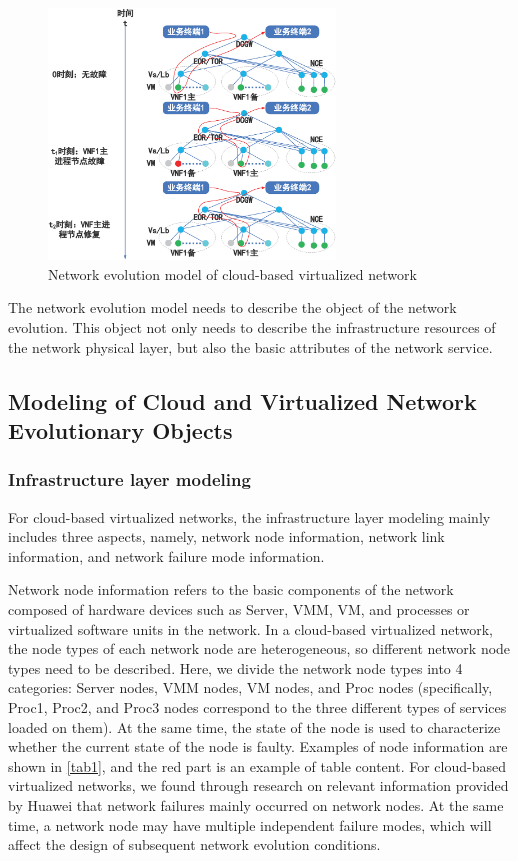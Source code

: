 \documentclass[journal]{IEEEtran}
\begin{document}
    \begin{figure}[!t]
        \begin{center}
            \includegraphics[width = 3in]{img/2.eps}
            \caption{Network evolution model of cloud-based virtualized network}
            \label{fig2}
        \end{center}
    \end{figure}
	
	The network evolution model needs to describe the object of the network evolution. This object not only needs to describe the infrastructure resources of the network physical layer, but also the basic attributes of the network service.
	
    \subsection{Modeling of Cloud and Virtualized Network Evolutionary Objects}

    \subsubsection{Infrastructure layer modeling}
    For cloud-based virtualized networks, the infrastructure layer modeling mainly includes three aspects, namely, network node information, network link information, and network failure mode information.


    Network node information refers to the basic components of the network composed of hardware devices such as Server, VMM, VM, and processes or virtualized software units in the network. In a cloud-based virtualized network, the node types of each network node are heterogeneous, so different network node types need to be described. Here, we divide the network node types into 4 categories: Server nodes, VMM nodes, VM nodes, and Proc nodes (specifically, Proc1, Proc2, and Proc3 nodes correspond to the three different types of services loaded on them). At the same time, the state of the node is used to characterize whether the current state of the node is faulty. Examples of node information are shown in \ref{tab1}, and the red part is an example of table content. For cloud-based virtualized networks, we found through research on relevant information provided by Huawei that network failures mainly occurred on network nodes. At the same time, a network node may have multiple independent failure modes, which will affect the design of subsequent network evolution conditions.
\end{document}
